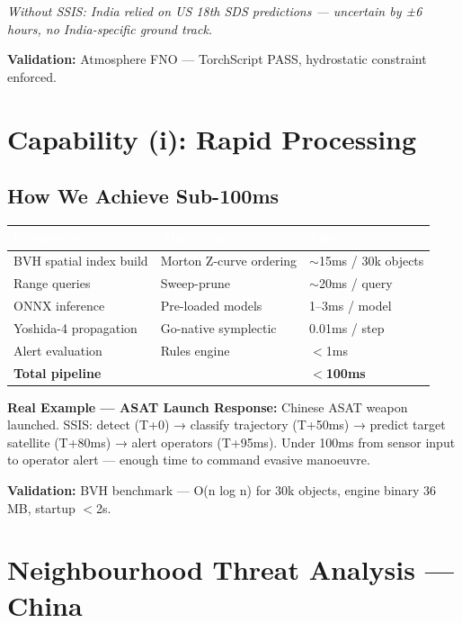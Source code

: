 \documentclass[11pt,a4paper]{article}
\newcommand{\TH}[1]{\textcolor{white}{\textbf{#1}}}
\begin{document}
\textit{Without SSIS: India relied on US 18th SDS predictions --- uncertain by ±6 hours, no India-specific ground track.}

\textbf{Validation:} Atmosphere FNO --- TorchScript PASS, hydrostatic constraint enforced.

\section{Capability (i): Rapid Processing}

\subsection{How We Achieve Sub-100ms}

\begin{table}[H]\centering\small
\begin{tabularx}{\textwidth}{|p{4.5cm}|X|p{3.5cm}|}
\hline
\rowcolor{dblue}\TH{Component} & \TH{Algorithm} & \TH{Time} \\
\hline
BVH spatial index build & Morton Z-curve ordering & $\sim$15ms / 30k objects \\
\hline
Range queries & Sweep-prune & $\sim$20ms / query \\
\hline
ONNX inference & Pre-loaded models & 1--3ms / model \\
\hline
Yoshida-4 propagation & Go-native symplectic & 0.01ms / step \\
\hline
Alert evaluation & Rules engine & $<$1ms \\
\hline
\textbf{Total pipeline} & & \textbf{$<$100ms} \\
\hline
\end{tabularx}
\end{table}

\textbf{Real Example --- ASAT Launch Response:} Chinese ASAT weapon launched. SSIS: detect (T+0) → classify trajectory (T+50ms) → predict target satellite (T+80ms) → alert operators (T+95ms). Under 100ms from sensor input to operator alert --- enough time to command evasive manoeuvre.

\textbf{Validation:} BVH benchmark --- O(n log n) for 30k objects, engine binary 36 MB, startup $<$2s.

\newpage
\section{Neighbourhood Threat Analysis --- China}
\end{document}
